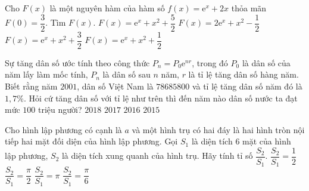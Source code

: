 \begin{ex}%
	Cho $F(x)$ là một nguyên hàm của hàm số $f(x)=\mathrm{e}^x+2x$ thỏa mãn $F(0)=\dfrac{3}{2}$. Tìm $F(x)$.
	\choice
	{$F(x)=\mathrm{e}^x+x^2+\dfrac{5}{2}$}
	{$F(x)=2\mathrm{e}^x+x^2-\dfrac{1}{2}$}
	{$F(x)=\mathrm{e}^x+x^2+\dfrac{3}{2}$}
	{\True $F(x)=\mathrm{e}^x+x^2+\dfrac{1}{2}$}
\end{ex}
\begin{ex}%
	Sự  tăng dân số ước tính theo công thức $P_n=P_0\mathrm{e}^{nr}$, trong đó $P_0$ là dân số của năm lấy làm mốc tính, $P_n$ là dân số sau $n$ năm, $r$ là tỉ lệ tăng dân số hàng năm. Biết rằng năm $2001$, dân số Việt Nam là $78685800$ và tỉ lệ tăng dân số năm đó là $1{,}7\%$. Hỏi cứ tăng dân số với tỉ lệ như trên thì đến năm nào dân số nước ta đạt mức $100$ triệu người?
	\choice
	{$2018$}
	{$2017$}
	{$2016$}
	{\True $2015$}
\end{ex}
\begin{ex}%
	Cho hình lập phương có cạnh là $a$ và một hình trụ có hai đáy là hai hình tròn nội tiếp hai mặt đối diện của hình lập phương. Gọi $S_1$ là diện tích $6$ mặt của hình lập phương, $S_2$ là diện tích xung quanh của hình trụ. Hãy tính tỉ số $\dfrac{S_2}{S_1}$.
	\choice
	{$\dfrac{S_2}{S_1}=\dfrac{1}{2}$}
	{$\dfrac{S_2}{S_1}=\dfrac{\pi}{2}$}
	{$\dfrac{S_2}{S_1}=\pi$}
	{\True $\dfrac{S_2}{S_1}=\dfrac{\pi}{6}$}
\end{ex}
